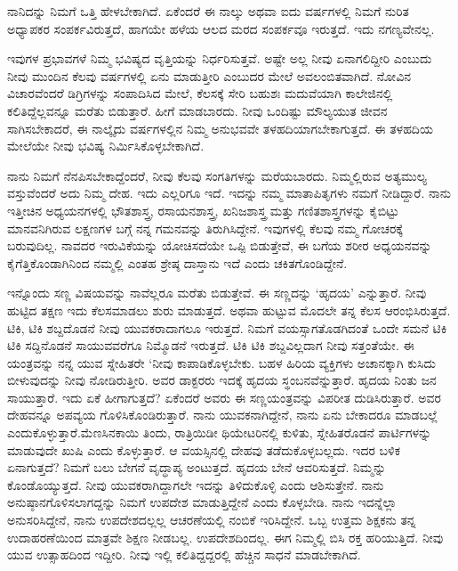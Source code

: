 ನಾನಿದನ್ನು ನಿಮಗೆ ಒತ್ತಿ ಹೇಳಬೇಕಾಗಿದೆ. ಏಕೆಂದರೆ ಈ ನಾಲ್ಕು ಅಥವಾ ಐದು ವರ್ಷಗಳಲ್ಲಿ ನಿಮಗೆ ನುರಿತ ಅಧ್ಯಾಪಕರ ಸಂಪರ್ಕವಿರುತ್ತದೆ, ಹಾಗಯೇ ಹಳೆಯ ಆಲದ ಮರದ ಸಂಪರ್ಕವೂ ಇರುತ್ತದೆ. ಇದು ನಗಣ್ಯವೇನಲ್ಲ.

ಇವುಗಳ ಪ್ರಭಾವಗಳೆ ನಿಮ್ಮ ಭವಿಷ್ಯದ ವೃತ್ತಿಯನ್ನು ನಿರ್ಧರಿಸುತ್ತವೆ. ಅಷ್ಟೇ ಅಲ್ಲ ನೀವು ಏನಾಗಲಿದ್ದೀರಿ ಎಂಬುದು ನೀವು ಮುಂದಿನ ಕೆಲವು ವರ್ಷಗಳಲ್ಲಿ ಏನು ಮಾಡುತ್ತೀರಿ ಎಂಬುದರ ಮೇಲೆ ಅವಲಂಬಿತವಾಗಿದೆ. ನೋವಿನ ವಿಚಾರವೆಂದರೆ ಡಿಗ್ರಿಗಳನ್ನು ಸಂಪಾದಿಸಿದ ಮೇಲೆ, ಕೆಲಸಕ್ಕೆ ಸೇರಿ ಬಹುಶಃ ಮದುವೆಯಾಗಿ ಕಾಲೇಜಿನಲ್ಲಿ ಕಲಿತಿದ್ದೆಲ್ಲವನ್ನೂ ಮರೆತು ಬಿಡುತ್ತಾರೆ. ಹೀಗೆ ಮಾಡಬಾರದು. ನೀವು ಒಂದಿಷ್ಟು ಮೌಲ್ಯಯುತ ಜೀವನ ಸಾಗಿಸಬೇಕಾದರೆ, ಈ ನಾಲ್ಕೈದು ವರ್ಷಗಳಲ್ಲಿನ ನಿಮ್ಮ ಅನುಭವವೇ ತಳಹದಿಯಾಗಬೇಕಾಗುತ್ತದೆ. ಈ ತಳಹದಿಯ ಮೇಲೆಯೇ ನೀವು ಭವಿಷ್ಯ ನಿರ್ಮಿಸಿಕೊಳ್ಳಬೇಕಾಗಿದೆ.

ನಾನು ನಿಮಗೆ ನೆನಪಿಸಬೇಕಾದ್ದೆಂದರೆ, ನೀವು ಕೆಲವು ಸಂಗತಿಗಳನ್ನು ಮರೆಯಬಾರದು. ನಿಮ್ಮಲ್ಲಿರುವ ಅತ್ಯಮುಲ್ಯ ವಸ್ತುವೆಂದರೆ ಅದು ನಿಮ್ಮ ದೇಹ. ಇದು ಎಲ್ಲರಿಗೂ ಇದೆ. ಇದನ್ನು ನಮ್ಮ ಮಾತಾಪಿತೃಗಳು ನಮಗೆ ನೀಡಿದ್ದಾರೆ. ನಾನು ಇತ್ತೀಚಿನ ಅಧ್ಯಯನಗಳಲ್ಲಿ ಭೌತಶಾಸ್ತ್ರ, ರಸಾಯನಶಾಸ್ತ್ರ, ಖನಿಜಶಾಸ್ತ್ರ ಮತ್ತು ಗಣಿತಶಾಸ್ತ್ರಗಳನ್ನು ಕೈಬಿಟ್ಟು ಮಾನವನಿಗಿರುವ ಲಕ್ಷಣಗಳ ಬಗ್ಗೆ ನನ್ನ ಗಮನವನ್ನು ತಿರುಗಿಸಿದ್ದೇನೆ. ಇವುಗಳಲ್ಲಿ ಕೆಲವು ನಮ್ಮ ಗೋಚರಕ್ಕೆ ಬರುವುದಿಲ್ಲ. ನಾವದರ ಇರುವಿಕೆಯನ್ನು ಯೋಚಿಸದೆಯೇ ಒಪ್ಪಿ ಬಿಡುತ್ತೇವೆ, ಈ ಬಗೆಯ ಶರೀರ ಅಧ್ಯಯನವನ್ನು ಕೈಗೆತ್ತಿಕೊಂಡಾಗಿನಿಂದ ನಮ್ಮಲ್ಲಿ ಎಂತಹ ಶ್ರೇಷ್ಠ ದಾಸ್ತಾನು ಇದೆ ಎಂದು ಚಕಿತಗೊಂಡಿದ್ದೇನೆ.

ಇನ್ನೊಂದು ಸಣ್ಣ ವಿಷಯವನ್ನು ನಾವೆಲ್ಲರೂ ಮರೆತು ಬಿಡುತ್ತೇವೆ. ಈ ಸಣ್ಣದನ್ನು ‘ಹೃದಯ’ ಎನ್ನುತ್ತಾರೆ. ನೀವು ಹುಟ್ಟಿದ ತಕ್ಷಣ ಇದು ಕೆಲಸಮಾಡಲು ಶುರು ಮಾಡುತ್ತದೆ. ಅಥವಾ ಹುಟ್ಟುವ ಮೊದಲೇ ತನ್ನ ಕೆಲಸ ಆರಂಭಿಸಿರುತ್ತದೆ. ಟಿಕಿ, ಟಿಕಿ ಶಬ್ದದೊಡನೆ ನೀವು ಯುವಕರಾದಾಗಲೂ ಇರುತ್ತದೆ. ನಿಮಗೆ ವಯಸ್ಸಾಗತೊಡಗಿದಂತೆ ಒಂದೇ ಸಮನೆ ಟಿಕಿ ಟಿಕಿ ಸದ್ದಿನೊಡನೆ ಸಾಯುವವರೆಗೂ ನಿಮ್ಮೊಡನೆ ಇರುತ್ತದೆ. ಟಿಕಿ ಟಿಕಿ ಶಬ್ದವಿಲ್ಲದಾಗ ನೀವು ಸತ್ತಂತೆಯೇ. ಈ ಯಂತ್ರವನ್ನು ನನ್ನ ಯುವ ಸ್ನೇಹಿತರೇ  ‘ನೀವು ಕಾಪಾಡಿಕೊಳ್ಳಬೇಕು. ಬಹಳ ಹಿರಿಯ ವ್ಯಕ್ತಿಗಳು ಅಚಾನಕ್ಕಾಗಿ ಕುಸಿದು ಬೀಳುವುದನ್ನು ನೀವು ನೋಡಿರುತ್ತೀರಿ. ಅವರ ಡಾಕ್ಟರರು ಇದಕ್ಕೆ ಹೃದಯ ಸ್ಥಂಬನವೆನ್ನುತ್ತಾರೆ. ಹೃದಯ ನಿಂತು ಜನ ಸಾಯುತ್ತಾರೆ. ಇದು ಏಕೆ ಹೀಗಾಗುತ್ತದೆ? ಏಕೆಂದರೆ ಅವರು ಈ ಸಣ್ಣಯಂತ್ರವನ್ನು ವಿಪರೀತ ದುಡಿಸಿರುತ್ತಾರೆ. ಅವರ ದೇಹವನ್ನೂ ಅಪವ್ಯಯ ಗೊಳಿಸಿಕೊಂಡಿರುತ್ತಾರೆ. ನಾನು ಯುವಕನಾಗಿದ್ದೇನೆ, ನಾನು ಏನು ಬೇಕಾದರೂ ಮಾಡಬಲ್ಲೆ ಎಂದುಕೊಳ್ಳುತ್ತಾರೆ.\break ಮೆಣಸಿನಕಾಯಿ ತಿಂದು, ರಾತ್ರಿಯಿಡೀ ಥಿಯೇಟರಿನಲ್ಲಿ ಕುಳಿತು, ಸ್ನೇಹಿತರೊಡನೆ ಪಾರ್ಟಿಗಳನ್ನು ಮಾಡುವುದೇ ಖುಷಿ ಎಂದು ಕೊಳ್ಳುತ್ತಾರೆ. ಆ ವಯಸ್ಸಿನಲ್ಲಿ ದೇಹವು ತಡೆದುಕೊಳ್ಳಬಲ್ಲದು. ಇದರ ಬಳಿಕ ಏನಾಗುತ್ತದೆ? ನಿಮಗೆ ಬಲು ಬೇಗನೆ ವೃದ್ಧಾಪ್ಯ ಅಂಟುತ್ತದೆ. ಹೃದಯ ಬೇನೆ ಆವರಿಸುತ್ತದೆ. ನಿಮ್ಮನ್ನು ಕೊಂಡೊಯ್ಯುತ್ತದೆ. ನೀವು ಯುವಕರಾಗಿದ್ದಾಗಲೇ ಇದನ್ನು ತಿಳಿದುಕೊಳ್ಳಿ ಎಂದು ಆಶಿಸುತ್ತೇನೆ. ನಾನು ಅನುಷ್ಠಾನಗೊಳಿಸಲಾಗದ್ದನ್ನು ನಿಮಗೆ ಉಪದೇಶ ಮಾಡುತ್ತಿದ್ದೇನೆ ಎಂದು ಕೊಳ್ಳಬೇಡಿ. ನಾನು ಇದನ್ನೆಲ್ಲಾ ಅನುಸರಿಸಿದ್ದೇನೆ, ನಾನು ಉಪದೇಶದಲ್ಲಲ್ಲ  ಆಚರಣೆಯಲ್ಲಿ ನಂಬಿಕೆ ಇರಿಸಿದ್ದೇನೆ. ಒಬ್ಬ ಉತ್ತಮ ಶಿಕ್ಷಕನು ತನ್ನ ಉದಾಹರಣೆಯಿಂದ ಮಾತ್ರವೇ ಶಿಕ್ಷಣ ನೀಡಬಲ್ಲ. ಉಪದೇಶದಿಂದಲ್ಲ. ಈಗ ನಿಮ್ಮಲ್ಲಿ ಬಿಸಿ ರಕ್ತ ಹರಿಯುತ್ತಿದೆ. ನೀವು ಯುವ ಉತ್ಸಾಹದಿಂದ ಇದ್ದೀರಿ. ನೀವು ಇಲ್ಲಿ ಕಲಿತಿದ್ದದ್ದರಲ್ಲಿ ಹೆಚ್ಚಿನ ಸಾಧನೆ ಮಾಡಬೇಕಾಗಿದೆ.

